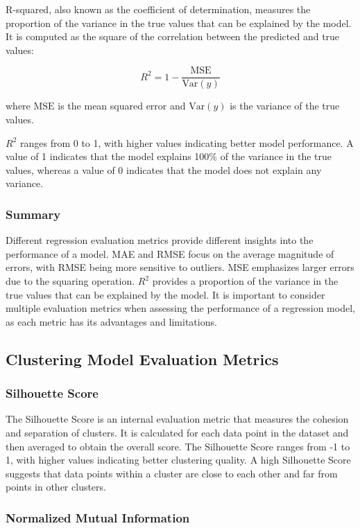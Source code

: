 \documentclass[12pt]{article}
\begin{document}
R-squared, also known as the coefficient of determination, measures the proportion of the variance in the true values that can be explained by the model. It is computed as the square of the correlation between the predicted and true values:

$$ R^2 = 1 - \frac{\text{MSE}}{\text{Var}(y)} $$

where $\text{MSE}$ is the mean squared error and $\text{Var}(y)$ is the variance of the true values.

$R^2$ ranges from 0 to 1, with higher values indicating better model performance. A value of 1 indicates that the model explains 100\% of the variance in the true values, whereas a value of 0 indicates that the model does not explain any variance.

\subsubsection{Summary}

Different regression evaluation metrics provide different insights into the performance of a model. MAE and RMSE focus on the average magnitude of errors, with RMSE being more sensitive to outliers. MSE emphasizes larger errors due to the squaring operation. $R^2$ provides a proportion of the variance in the true values that can be explained by the model. It is important to consider multiple evaluation metrics when assessing the performance of a regression model, as each metric has its advantages and limitations.
\subsection{Clustering Model Evaluation Metrics}
\subsubsection{Silhouette Score}

The Silhouette Score is an internal evaluation metric that measures the cohesion and separation of clusters. It is calculated for each data point in the dataset and then averaged to obtain the overall score. The Silhouette Score ranges from -1 to 1, with higher values indicating better clustering quality. A high Silhouette Score suggests that data points within a cluster are close to each other and far from points in other clusters.

\subsubsection{Normalized Mutual Information}
\end{document}
